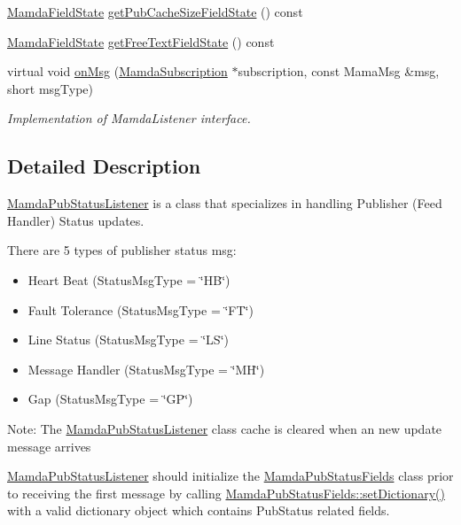 \begin{CompactItemize}
\item 
\hyperlink{namespaceWombat_93aac974f2ab713554fd12a1fa3b7d2a}{Mamda\-Field\-State} \hyperlink{classWombat_1_1MamdaPubStatusListener_af630b2a9c628d5bad3f6b48bb1de598}{get\-Pub\-Cache\-Size\-Field\-State} () const 
\item 
\hyperlink{namespaceWombat_93aac974f2ab713554fd12a1fa3b7d2a}{Mamda\-Field\-State} \hyperlink{classWombat_1_1MamdaPubStatusListener_2ae0c7afe5e413d50eb94497163d400f}{get\-Free\-Text\-Field\-State} () const 
\item 
virtual void \hyperlink{classWombat_1_1MamdaPubStatusListener_310318bfb5b54acdee23429c6db68dd2}{on\-Msg} (\hyperlink{classWombat_1_1MamdaSubscription}{Mamda\-Subscription} $\ast$subscription, const Mama\-Msg \&msg, short msg\-Type)
\begin{CompactList}\small\item\em Implementation of Mamda\-Listener interface. \item\end{CompactList}\end{CompactItemize}


\subsection{Detailed Description}
\hyperlink{classWombat_1_1MamdaPubStatusListener}{Mamda\-Pub\-Status\-Listener} is a class that specializes in handling Publisher (Feed Handler) Status updates. 

There are 5 types of publisher status msg:\begin{itemize}
\item Heart Beat (Status\-Msg\-Type = \char`\"{}HB\char`\"{})\item Fault Tolerance (Status\-Msg\-Type = \char`\"{}FT\char`\"{})\item Line Status (Status\-Msg\-Type = \char`\"{}LS\char`\"{})\item Message Handler (Status\-Msg\-Type = \char`\"{}MH\char`\"{})\item Gap (Status\-Msg\-Type = \char`\"{}GP\char`\"{})\end{itemize}


Note: The \hyperlink{classWombat_1_1MamdaPubStatusListener}{Mamda\-Pub\-Status\-Listener} class cache is cleared when an new update message arrives

\hyperlink{classWombat_1_1MamdaPubStatusListener}{Mamda\-Pub\-Status\-Listener} should initialize the \hyperlink{classWombat_1_1MamdaPubStatusFields}{Mamda\-Pub\-Status\-Fields} class prior to receiving the first message by calling \hyperlink{classWombat_1_1MamdaPubStatusFields_0244fb3aa4d6a3696bb88ecbdc4089b7}{Mamda\-Pub\-Status\-Fields::set\-Dictionary()} with a valid dictionary object which contains Pub\-Status related fields. 



